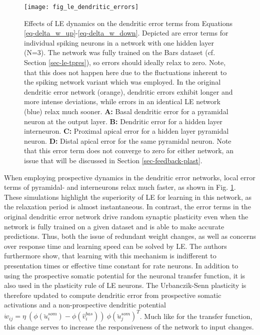 \begin{figure}[h!]
  \centering
  \texttt{[image: fig\_le\_dendritic\_errors]}
  \caption[Effects of LE dynamics on dendritic error]{Effects of LE dynamics on the dendritic error terms from Equations
    \ref{eq-delta_w_up}-\ref{eq-delta_w_down}. Depicted are error terms for individual spiking neurons in a network with
    one hidden layer (N=3). The network was fully trained on the Bars dataset (cf. Section \ref{sec-le-tpres}), so
    errors should ideally relax to zero. Note, that this does not happen here due to the fluctuations inherent to the
    spiking network variant which was employed. In the original dendritic error network (orange), dendritic errors
    exhibit longer and more intense deviations, while errors in an identical LE network (blue) relax much sooner.
    \textbf{A:} Basal dendritic error for a pyramidal neuron at the output layer. \textbf{B:} Dendritic error for a
    hidden layer interneuron. \textbf{C:} Proximal apical error for a hidden layer pyramidal neuron. \textbf{D:} Distal
    apical error for the same pyramidal neuron. Note that this error term does not converge to zero for either network,
    an issue that will be discussed in Section \ref{sec-feedback-plast}.}
  \label{fig-error-comp-le}
\end{figure}


When employing prospective dynamics in the dendritic error networks, local error terms of pyramidal- and interneurons
relax much faster, as shown in Fig. \ref{fig-error-comp-le}. These simulations highlight the superiority of LE for
learning in this network, as the relaxation period is almost instantaneous. In contrast, the error terms in the original
dendritic error network drive random synaptic plasticity even when the network is fully trained on a given dataset and
is able to make accurate predictions. Thus, both the issue of redundant weight changes, as well as concerns over
response time and learning speed can be solved by LE. The authors furthermore show, that learning with this mechanism is
indifferent to presentation times or effective time constant for rate neurons. In addition to using the prospective
somatic potential for the neuronal transfer function, it is also used in the plasticity rule of LE neurons. The
Urbanczik-Senn plasticity is therefore updated to compute dendritic error from prospective somatic activations and a
non-prospective dendritic potential $\dot{w}_{ij}= \eta \ ( \phi(\breve{u}_i^{som}) - \phi(\hat{v}_i^{bas}) ) \
\phi(\breve{u}_j^{som})^T$. Much like for the transfer function, this change serves to increase the responsiveness of
the network to input changes.

